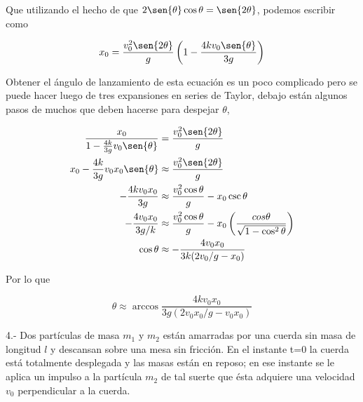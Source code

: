\documentclass[a4paper,10pt]{article}
\numberwithin{equation}{section}
\begin{document}
Que utilizando el hecho de que $2\sen{\theta}\cos{\theta} = \sen{2\theta}$, podemos
escribir como

\begin{equation}
 x_0 = \frac{v_0^2 \sen{2\theta}}{g}\left(1 - \frac{4k v_0 \sen{\theta} }{3g} \right)
\end{equation}

Obtener el ángulo de lanzamiento de esta ecuación es un poco complicado
pero se puede hacer luego de tres expansiones en series de Taylor, debajo
están algunos pasos de muchos que deben hacerse para despejar $\theta$,

\begin{align}
 \begin{split}
  \frac{x_0}{1- \frac{4k}{3g}v_0 \sen{\theta}} &= \frac{v_0^2 \sen{2\theta}}{g} \\
  x_0 - \frac{4k}{3g}v_0 x_0 \sen{\theta} &\approx \frac{v_0^2 \sen{2\theta}}{g} \\
  - \frac{4k v_0 x_0}{3g} &\approx \frac{v_0^2 \cos{\theta}}{g} - x_0 \csc{\theta} \\
  - \frac{4 v_0 x_0}{3g/k} &\approx \frac{v_0^2 \cos{\theta}}{g} - x_0 \left( \frac{cos\theta}{\sqrt{1-\cos^2{\theta}}}\right) \\
  \cos{\theta} &\approx - \frac{4 v_0 x_0}{3k (2  v_0/g - x_0)}
 \end{split}
\end{align}

Por lo que 

\begin{equation}
 \theta \approx \arccos{\frac{4k v_0 x_0}{3g (2 v_0 x_0/g - v_0 x_0)}}
\end{equation}

























\vspace{.3cm}

4.- Dos partículas de masa $m_1$ y $m_2$ están amarradas por una cuerda sin masa de 
longitud $l$ y descansan sobre una mesa sin fricción. En el instante t=0 la cuerda
está totalmente desplegada y las masas están en reposo; en ese instante se le aplica
un impulso a la partícula $m_2$ de tal suerte que ésta adquiere una velocidad $v_0$ 
perpendicular a la cuerda.
\end{document}
